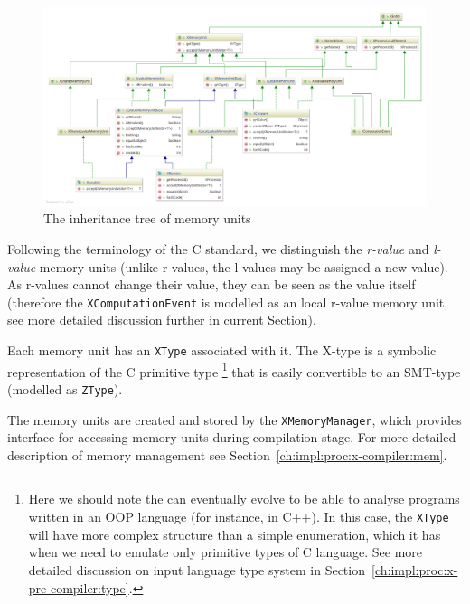 \begin{figure}[t]%
  \centering
  \includegraphics[width=\textwidth,height=\textheight,keepaspectratio]{img/my/class-diagrams/XMemoryUnit-m.png}
  \caption{The inheritance tree of \xgraph{} memory units}
  \label{fig:class-diagrams:XMemoryUnit}
\end{figure}

Following the terminology of the C standard, we distinguish the \textit{r-value} and \textit{l-value} memory units (unlike r-values, the l-values may be assigned a new value).
As r-values cannot change their value, they can be seen as the value itself (therefore the \texttt{XComputationEvent} is modelled as an local r-value memory unit, see more detailed discussion further in current Section).

Each memory unit has an \texttt{XType} associated with it.
The X-type is a symbolic representation of the C primitive type%
\footnote{Here we should note the \porthos[2] can eventually evolve to be able to analyse programs written in an OOP language (for instance, in C++). In this case, the \texttt{XType} will have more complex structure than a simple enumeration, which it has when we need to emulate only primitive types of C language. See more detailed discussion on input language type system in Section~\ref{ch:impl:proc:x-pre-compiler:type}.} %
that is easily convertible to an SMT-type (modelled as \texttt{ZType}).%

The memory units are created and stored by the \texttt{XMemoryManager}, which provides interface for accessing memory units during compilation stage.
For more detailed description of memory management see Section~\ref{ch:impl:proc:x-compiler:mem}.

